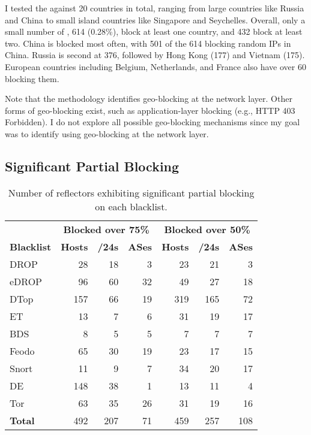 I tested the {} against 20 countries in total, ranging
from large countries like Russia and China to small island countries
like Singapore and Seychelles.  Overall, only a small number of
{}, 614 (0.28\%), block at least one country, and 432 block
at least two.  China is blocked most often, with 501 of the 614
{} blocking random IPs in China.  Russia is second at 376,
followed by Hong Kong (177) and Vietnam (175).  European countries
including Belgium, Netherlands, and France also have over 60
{} blocking them.

Note that the methodology identifies geo-blocking at the network
layer.  Other forms of geo-blocking exist, such as application-layer
blocking (e.g., HTTP 403 Forbidden).  I do not explore all possible
geo-blocking mechanisms since my goal was to identify {}
using geo-blocking at the network layer.

\subsection{Significant Partial Blocking}

\begin{table}[t]
\centering
\caption{Number of reflectors exhibiting significant partial blocking on each blacklist.}
\begin{tabular}{l r r r | r r r }
 \toprule
 \textbf{}           &\multicolumn{3}{c}{\textbf{Blocked over 75\%}}    &\multicolumn{3}{c}{\textbf{Blocked over 50\%}} \\
 \textbf{Blacklist}  &\textbf{Hosts}   &\textbf{/24s}   &\textbf{ASes}  &\textbf{Hosts}   &\textbf{/24s}   &\textbf{ASes} \\
 \midrule
 DROP      & 28      & 18     & 3   &  23      & 21    & 3\\
 eDROP     & 96      & 60     & 32  &  49      & 27    & 18\\
 DTop        & 157     & 66     & 19  &  319     & 165   & 72\\
 ET     & 13      & 7      & 6   &  31      & 19    & 17\\
 BDS           & 8       & 5      & 5   &  7       & 7     & 7\\
 Feodo             & 65      & 30     & 19  &  23      & 17    & 15\\
 Snort       & 11      & 9      & 7   &  34      & 20    & 17\\
 DE       & 148     & 38     & 1   &  13      & 11    & 4\\
 Tor             & 63      & 35     & 26  &  31      & 19    & 16\\
 \midrule
 \textbf{Total}              & 492     & 207    & 71  & 459      & 257   & 108\\
 \bottomrule
\end{tabular}

\label{tab:partial-blocking-reflectors}
\end{table}



